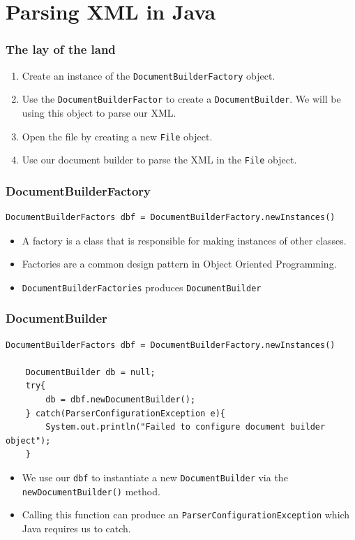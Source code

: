 \documentclass{beamer}
\begin{document}
\section{Parsing XML in Java}
\begin{frame}
    \frametitle{The lay of the land}
    \begin{enumerate}
        \item Create an instance of the \lstinline|DocumentBuilderFactory| object.
        \item Use the \lstinline|DocumentBuilderFactor| to create a \lstinline|DocumentBuilder|. We will be using this object to parse our XML.
        \item Open the file by creating a new \lstinline|File| object.
        \item Use our document builder to parse the XML in the \lstinline|File| object.
    \end{enumerate}
\end{frame}

\begin{frame}[fragile]
    \frametitle{DocumentBuilderFactory}
    \begin{lstlisting}[basicstyle=\tiny]
    DocumentBuilderFactors dbf = DocumentBuilderFactory.newInstances()
    \end{lstlisting}
    \begin{itemize}
        \item A factory is a class that is responsible for making instances of other classes.
        \item Factories are a common design pattern in Object Oriented Programming.
        \item \lstinline|DocumentBuilderFactories| produces \lstinline|DocumentBuilder|
    \end{itemize}
\end{frame}

\begin{frame}[fragile]
    \frametitle{DocumentBuilder}
    \begin{lstlisting}[basicstyle=\tiny]
    DocumentBuilderFactors dbf = DocumentBuilderFactory.newInstances()

    DocumentBuilder db = null;
    try{
        db = dbf.newDocumentBuilder();
    } catch(ParserConfigurationException e){
        System.out.println("Failed to configure document builder object");
    }
    \end{lstlisting}
    \begin{itemize}
        \item We use our \lstinline|dbf| to instantiate a new \lstinline|DocumentBuilder| via the \lstinline|newDocumentBuilder()| method.
        \item Calling this function can produce an \lstinline|ParserConfigurationException| which Java requires us to catch.
    \end{itemize}
\end{frame}
\end{document}
